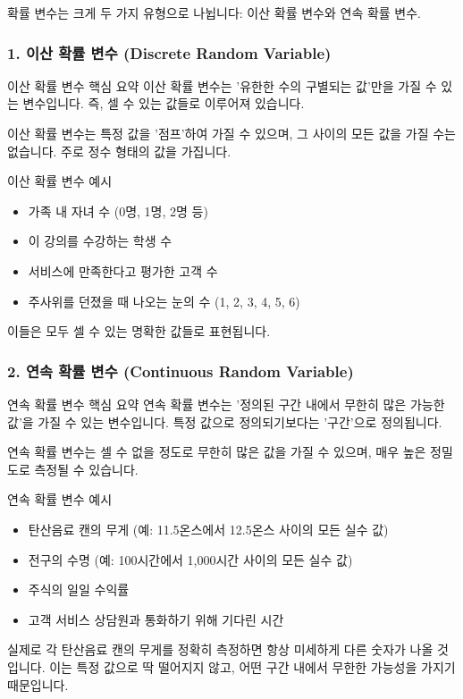 \documentclass[11pt,a4paper]{article}
\begin{document}
확률 변수는 크게 두 가지 유형으로 나뉩니다: 이산 확률 변수와 연속 확률 변수.

\subsubsection*{1. 이산 확률 변수 (Discrete Random Variable)}

\begin{summarybox}{이산 확률 변수 핵심 요약}
이산 확률 변수는 '유한한 수의 구별되는 값'만을 가질 수 있는 변수입니다. 즉, 셀 수 있는 값들로 이루어져 있습니다.
\end{summarybox}

이산 확률 변수는 특정 값을 '점프'하여 가질 수 있으며, 그 사이의 모든 값을 가질 수는 없습니다. 주로 정수 형태의 값을 가집니다.

\begin{examplebox}{이산 확률 변수 예시}
\begin{itemize}
    \item 가족 내 자녀 수 (0명, 1명, 2명 등)
    \item 이 강의를 수강하는 학생 수
    \item 서비스에 만족한다고 평가한 고객 수
    \item 주사위를 던졌을 때 나오는 눈의 수 (1, 2, 3, 4, 5, 6)
\end{itemize}
이들은 모두 셀 수 있는 명확한 값들로 표현됩니다.
\end{examplebox}

\subsubsection*{2. 연속 확률 변수 (Continuous Random Variable)}

\begin{summarybox}{연속 확률 변수 핵심 요약}
연속 확률 변수는 '정의된 구간 내에서 무한히 많은 가능한 값'을 가질 수 있는 변수입니다. 특정 값으로 정의되기보다는 '구간'으로 정의됩니다.
\end{summarybox}

연속 확률 변수는 셀 수 없을 정도로 무한히 많은 값을 가질 수 있으며, 매우 높은 정밀도로 측정될 수 있습니다.

\begin{examplebox}{연속 확률 변수 예시}
\begin{itemize}
    \item 탄산음료 캔의 무게 (예: 11.5온스에서 12.5온스 사이의 모든 실수 값)
    \item 전구의 수명 (예: 100시간에서 1,000시간 사이의 모든 실수 값)
    \item 주식의 일일 수익률
    \item 고객 서비스 상담원과 통화하기 위해 기다린 시간
\end{itemize}
실제로 각 탄산음료 캔의 무게를 정확히 측정하면 항상 미세하게 다른 숫자가 나올 것입니다. 이는 특정 값으로 딱 떨어지지 않고, 어떤 구간 내에서 무한한 가능성을 가지기 때문입니다.
\end{examplebox}
\end{document}
